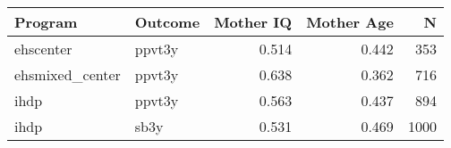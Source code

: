 \begin{table}[ht]
\centering
\begin{tabular}{llrrr}
  \hline
Program & Outcome & Mother IQ & Mother Age & N \\ 
  \hline
ehscenter & ppvt3y & 0.514 & 0.442 & 353 \\ 
  ehsmixed\_center & ppvt3y & 0.638 & 0.362 & 716 \\ 
  ihdp & ppvt3y & 0.563 & 0.437 & 894 \\ 
  ihdp & sb3y & 0.531 & 0.469 & 1000 \\ 
   \hline
\end{tabular}
\end{table}

